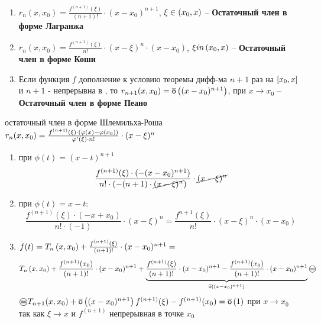 \begin{sledsv}
	\begin{enumerate}
		\item $r_n(x,x_0) = \frac{f^{(n+1)}(\xi)}{(n+1)!}\cdot (x-x_0)^{n+1}$, $\xi \in \left( x_0,x\right)$ -- \textbf{Остаточный член в форме Лагранжа}
		\item $r_n(x,x_0) = \frac{f^{(n+1)}(\xi)}{n!}\cdot (x-\xi)^{n}\cdot (x-x_0)$, $\xi in \left( x_0, x\right)$ -- \textbf{Остаточный член в форме Коши}
		\item Если функция $f$ дополнение к условию теоремы дифф-ма $n+1$ раз на $\left[ x_0,x\right]$ и $n+1$ - непрерывна в , то $r_{n+1}(x,x_0) = \overline{\mathsf{o}}\left( (x-x_0)^{n+1}\right)$, при $x \to x_0$  -- \textbf{Остаточный член в форме Пеано}
	\end{enumerate}

	\begin{dokvo}
		остаточный член в форме Шлемильха-Роша $r_n(x,x_0) = \frac{f^{(n+1)}(\xi)  \cdot (\varphi(x)-\varphi(x_0))}{\varphi^{\prime}(\xi) \cdot n!}\cdot (x-\xi)^{n}$
		\begin{enumerate}
			\item при $\phi(t) = (x-t)^{n+1}$
			$$\frac{f^{(n+1)}(\xi) \cdot (-(x-x_0)^{n+1})}{n! \cdot (-(n+1)\cdot \cancel{(x - \xi)^{n}})}\cdot \cancel{(x-\xi)^{n}}$$
			\item при $\phi(t) = x - t:$
			$$\frac{f^{(n+1)}(\xi)\cdot (-x + x_0)}{n! \cdot (-1)}\cdot (x - \xi)^n = \frac{f^{n+1}(\xi)}{n!}\cdot(x-\xi)^{n}\cdot (x - x_0)$$
			\item $f(t) = T_n\left( x,x_0\right) + \frac{f^{(n+1)}(\xi)}{(n+1)!}\cdot (x-x_0)^{n+1} =$
			$$T_n\skobk{x,x_0} + \frac{f^{(n+1)}(x_0)}{(n+1)!}\cdot (x-x_0)^{n+1} + \underbrace{\frac{f^{(n+1)}(\xi)}{(n+1)!}\cdot (x-x_0)^{n+1} - \frac{f^{(n+1)}(x_0)}{(n+1)!}\cdot (x-x_0)^{n+1}}_{\omaloe{(x-x_0)^{n+1}}} \oeq$$
			$\oeq T_{n+1}(x,x_0) + \omaloe{ (x-x_0)^{n+1}} f^{(n+1)}(\xi)-f^{(n+1)}(x_0)=\omaloe{1}$ при $x\to x_0$ так как $\xi \to x$ и $f^{(n+1)}$ непрерывная в точке $x_0$
		\end{enumerate}
	\end{dokvo}
\end{sledsv}

\begin{proofs}

\end{proofs}
